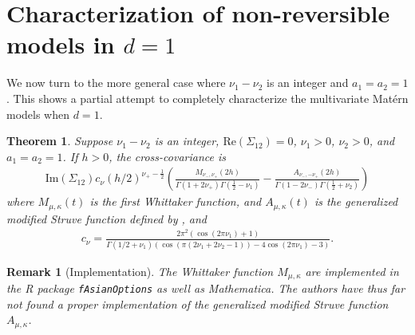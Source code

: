 \documentclass[11pt]{article}
\newtheorem{theorem}{Theorem}
\newtheorem*{remark}{Remark}
\begin{document}






\pagebreak

\appendix

\section{Characterization of non-reversible models in $d=1$}

We now turn to the more general case where $\nu_1 - \nu_2$ is an integer and $a_1 = a_2 = 1$. This shows a partial attempt to completely characterize the multivariate Mat\'ern models when $d=1$. 

\begin{theorem}
Suppose $\nu_1 - \nu_2$ is an integer, $\textrm{Re}(\Sigma_{12}) = 0$, $\nu_1 > 0$, $\nu_2 > 0$, and $a_1 = a_2 = 1$. If $h > 0$, the cross-covariance is \begin{align*}
\textrm{Im}(\Sigma_{12}) c_\nu
(h/2)^{\nu_+-\frac12}\left(\frac{M_{\nu_-,\nu_+}(2h)}{\Gamma(1 + 2\nu_+)\Gamma(\frac12 - \nu_{1})} - \frac{ A_{\nu_-,-\nu_+}(2h)}{\Gamma(1 - 2\nu_-)\Gamma(\frac12 + \nu_{2})}\right)
\end{align*}where $M_{\mu, \kappa}(t)$ is the first Whittaker function, and $A_{\mu, \kappa}(t)$ is the generalized modified Struve function defined by \cite{babister_transcendental_1967}, and \begin{align*}
c_\nu = \frac{2\pi^2(\cos(2 \pi \nu_1) + 1)}{\Gamma(1/2 + \nu_{1})(\cos(\pi (2\nu_1 + 2\nu_2-1)) - 4\cos(2\pi \nu_1) - 3)}.
\end{align*}
\end{theorem}

\begin{remark}[Implementation]\normalfont
The Whittaker function $M_{\mu, \kappa}$ are implemented in the R package \texttt{fAsianOptions} as well as Mathematica. The authors have thus far not found a proper implementation of the generalized modified Struve function $A_{\mu, \kappa}$.
\end{remark}
\end{document}

